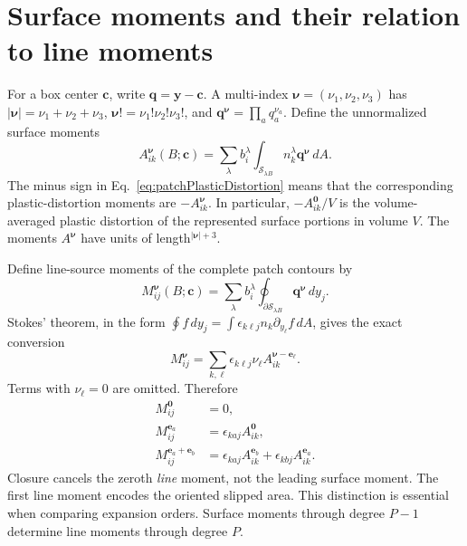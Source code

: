 \section{Surface moments and their relation to line moments}
For a box center $\bm c$, write $\bm q=\bm y-\bm c$. A multi-index $\boldsymbol\nu=(\nu_1,\nu_2,\nu_3)$ has $|\boldsymbol\nu|=\nu_1+\nu_2+\nu_3$, $\boldsymbol\nu!=\nu_1!\nu_2!\nu_3!$, and $\bm q^{\boldsymbol\nu}=\prod_a q_a^{\nu_a}$. Define the unnormalized surface moments
\begin{equation}
 A_{ik}^{\boldsymbol\nu}(B;\bm c)
 =\sum_\lambda b_i^\lambda\int_{\mathcal S_{\lambda B}}
 n_k^\lambda\bm q^{\boldsymbol\nu}\,dA.
 \label{eq:patchAreaMoments}
\end{equation}
The minus sign in Eq.~\eqref{eq:patchPlasticDistortion} means that the corresponding plastic-distortion moments are $-A_{ik}^{\boldsymbol\nu}$. In particular, $-A_{ik}^{\boldsymbol0}/V$ is the volume-averaged plastic distortion of the represented surface portions in volume $V$. The moments $A^{\boldsymbol\nu}$ have units of length$^{|\boldsymbol\nu|+3}$.

Define line-source moments of the complete patch contours by
\begin{equation}
 M_{ij}^{\boldsymbol\nu}(B;\bm c)
 =\sum_\lambda b_i^\lambda\oint_{\partial\mathcal S_{\lambda B}}
 \bm q^{\boldsymbol\nu}\,dy_j.
 \label{eq:patchLineMoments}
\end{equation}
Stokes' theorem, in the form
$\oint f\,dy_j=\int\epsilon_{k\ell j}n_k\partial_{y_\ell}f\,dA$,
gives the exact conversion
\begin{equation}
 \boxed{M_{ij}^{\boldsymbol\nu}
 =\sum_{k,\ell}\epsilon_{k\ell j}\nu_\ell
 A_{ik}^{\boldsymbol\nu-\bm e_\ell}.}
 \label{eq:areaToLineMoments}
\end{equation}
Terms with $\nu_\ell=0$ are omitted. Therefore
\begin{align}
 M_{ij}^{\boldsymbol0}&=0,\label{eq:closedPatchZeroMoment}\\
 M_{ij}^{\bm e_a}&=\epsilon_{kaj}A_{ik}^{\boldsymbol0},\\
 M_{ij}^{\bm e_a+\bm e_b}
 &=\epsilon_{kaj}A_{ik}^{\bm e_b}+\epsilon_{kbj}A_{ik}^{\bm e_a}.
\end{align}
Closure cancels the zeroth \emph{line} moment, not the leading surface moment. The first line moment encodes the oriented slipped area. This distinction is essential when comparing expansion orders. Surface moments through degree $P-1$ determine line moments through degree $P$.

